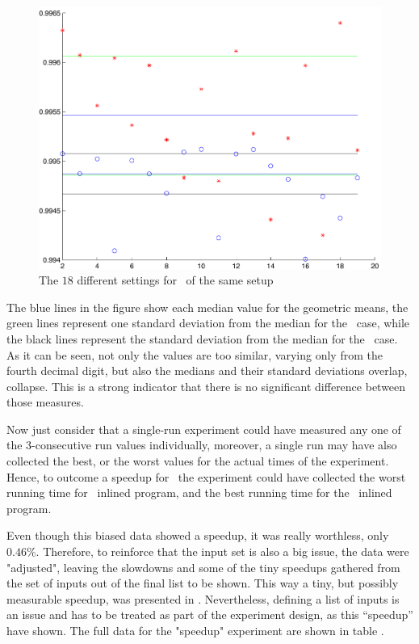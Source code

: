 \begin{figure}
  \centering
  \includegraphics[width=1.00\linewidth]{Figures/fdllrep}
  \caption{The $18$ different settings for \bzip\ of the same setup}
  \label{fig:fdllrep}
\end{figure}

The blue lines in the figure show each median value for the geometric means, the green lines represent one standard deviation from the median for the \FDI\ case, while the black lines represent the standard deviation from the median for the \llvm\ case. As it can be seen, not only the values are too similar, varying only from the fourth decimal digit, but also the medians and their standard deviations overlap, collapse. This is a strong indicator that there is no significant difference between those measures.

Now just consider that a single-run experiment could have measured any one of the $3$-consecutive run values individually, moreover, a single run may have also collected the best, or the worst values for the actual times of the experiment. Hence, to outcome a speedup for \FDI\, the experiment could have collected the worst running time for \llvm\ inlined program, and the best running time for the \FDI\ inlined program.

Even though this biased data showed a speedup, it was really worthless, only $0.46 \%$. Therefore, to reinforce that the input set is also a big issue, the data were "adjusted", leaving the slowdowns and some of the tiny speedups gathered from the set of inputs out of the final list to be shown. This way a tiny, but possibly measurable speedup, was presented in . Nevertheless, defining a list of inputs is an issue and has to be treated as part of the experiment design, as this ``speedup'' have shown. The full data for the "speedup" experiment are shown in table .

